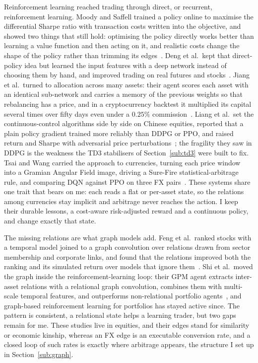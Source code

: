 \documentclass[12pt,a4paper]{article}
\begin{document}
Reinforcement learning reached trading through direct, or recurrent, reinforcement learning.
Moody and Saffell trained a policy online to maximise the differential Sharpe ratio with
transaction costs written into the objective, and showed two things that still hold:
optimising the policy directly works better than learning a value function and then acting on
it, and realistic costs change the shape of the policy rather than trimming its
edges~\citep{moody2001}. Deng et al.\ kept that direct-policy idea but learned the input
features with a deep network instead of choosing them by hand, and improved trading on real
futures and stocks~\citep{deng2017}. Jiang et al.\ turned to allocation across many assets:
their agent scores each asset with an identical sub-network and carries a memory of the
previous weights so that rebalancing has a price, and in a cryptocurrency backtest it
multiplied its capital several times over fifty days even under a $0.25\%$
commission~\citep{jiang2017portfolio}. Liang et al.\ set the continuous-control algorithms
side by side on Chinese equities, reported that a plain policy gradient trained more reliably
than DDPG or PPO, and raised return and Sharpe with adversarial price
perturbations~\citep{liang2018adversarial}; the fragility they saw in DDPG is the weakness the
TD3 stabilisers of Section~\ref{sub:td3} were built to fix. Tsai and Wang carried the approach
to currencies, turning each price window into a Gramian Angular Field image, driving a
Sure-Fire statistical-arbitrage rule, and comparing DQN against PPO on three FX
pairs~\citep{tsai2019fxrl}. These systems share one trait that bears on me: each reads a flat
or per-asset state, so the relations among currencies stay implicit and arbitrage never
reaches the action. I keep their durable lessons, a cost-aware risk-adjusted reward and a
continuous policy, and change exactly that state.

The missing relations are what graph models add. Feng et al.\ ranked stocks with a temporal
model joined to a graph convolution over relations drawn from sector membership and corporate
links, and found that the relations improved both the ranking and its simulated return over
models that ignore them~\citep{feng2019temporal}. Shi et al.\ moved the graph inside the
reinforcement-learning loop: their GPM agent extracts inter-asset relations with a relational
graph convolution, combines them with multi-scale temporal features, and outperforms
non-relational portfolio agents~\citep{shi2022gpm}, and graph-based reinforcement learning for
portfolios has stayed active since. The pattern is consistent, a relational state helps a
learning trader, but two gaps remain for me. These studies live in equities, and their edges
stand for similarity or economic kinship, whereas an FX edge is an executable conversion rate,
and a closed loop of such rates is exactly where arbitrage appears, the structure I set up in
Section~\ref{sub:graph}.
\end{document}

